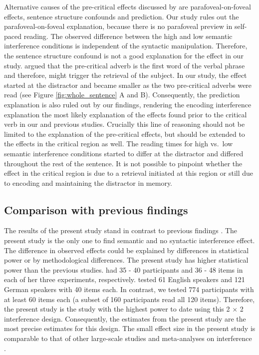 \documentclass[a4paper, man, floatsintext]{apa7}
\begin{document}
Alternative causes of the pre-critical effects discussed by \citet{mertzen} are parafoveal-on-foveal effects, sentence structure confounds and prediction. Our study rules out the parafoveal-on-foveal explanation, because there is no parafoveal preview in self-paced reading. The observed difference between the high and low semantic interference conditions is independent of the syntactic manipulation. Therefore, the sentence structure confound is not a good explanation for the effect in our study. \citet{mertzen} argued that the pre-critical adverb is the first word of the verbal phrase and therefore, might trigger the retrieval of the subject. In our study, the effect started at the distractor and became smaller as the two pre-critical adverbs were read (see Figure \ref{fig:whole_sentence} A and B). Consequently, the prediction explanation is also ruled out by our findings, rendering the encoding interference explanation the most likely explanation of the effects found prior to the critical verb in our and previous studies. Crucially this line of reasoning should not be limited to the explanation of the pre-critical effects, but should be extended to the effects in the critical region as well. The reading times for high vs.\ low semantic interference conditions started to differ at the distractor and differed throughout the rest of the sentence. It is not possible to pinpoint whether the effect in the critical region is due to a retrieval initiated at this region or still due to encoding and maintaining the distractor in memory.

\subsection{Comparison with previous findings}
The results of the present study stand in contrast to previous findings \citep{vandyke07, mertzen}. The present study is the only one to find semantic and no syntactic interference effect. The difference in observed effects could be explained by differences in statistical power or by methodological differences. The present study has higher statistical power than the previous studies. \citet{vandyke07} had 35 - 40 participants and 36 - 48 items in each of her three experiments, respectively. \cite{mertzen} tested 61 English speakers and 121 German speakers with 40 items each. In contrast, we tested 774 participants with at least 60 items each (a subset of 160 participants read all 120 items). Therefore, the present study is the study with the highest power to date using this 2 $\times$ 2 interference design. Consequently, the estimates from the present study are the most precise estimates for this design. The small effect size in the present study is comparable to that of other large-scale studies \citep{nicenboim} and meta-analyses on interference \citep{jaeger_etal_2017}.
\end{document}
